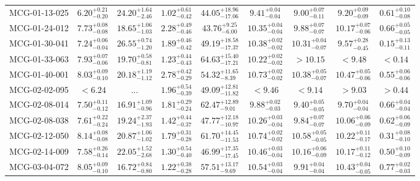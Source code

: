 \documentclass[onecolumn]{mn2e}
\begin{document}
{\begin{center}
\begin{longtable}{lcccccccc}
MCG-01-13-025 & $6.20_{-0.20}^{+0.21}$ & $24.20_{-2.46}^{+1.64}$ & $1.02_{-0.42}^{+0.61}$ &$44.05_{-17.06}^{+18.96}$ & $9.41_{-0.04}^{+0.04}$ & $9.00_{-0.11}^{+0.07}$ & $9.20_{-0.09}^{+0.09}$ & $0.61_{-0.08}^{+0.10}$ \\
MCG-01-24-012 & $7.73_{-0.08}^{+0.08}$ & $18.65_{-1.03}^{+1.06}$ & $2.28_{-0.46}^{+0.49}$ &$43.76_{-6.00}^{+9.25}$ & $10.35_{-0.04}^{+0.04}$ & $9.88_{-0.07}^{+0.07}$ & $10.17_{-0.06}^{+0.07}$ & $0.66_{-0.05}^{+0.05}$ \\
MCG-01-30-041 & $7.24_{-0.04}^{+0.06}$ & $26.55_{-1.20}^{+0.74}$ & $1.89_{-0.42}^{+0.46}$ &$49.19_{-17.37}^{+18.58}$ & $10.38_{-0.02}^{+0.02}$ & $10.31_{-0.07}^{+0.04}$ & $9.57_{-0.45}^{+0.28}$ & $0.15_{-0.11}^{+0.13}$ \\
MCG-01-33-063 & $7.93_{-0.06}^{+0.07}$ & $19.70_{-0.81}^{+0.58}$ & $1.23_{-0.43}^{+0.44}$ &$64.63_{-17.21}^{+15.40}$ & $10.22_{-0.02}^{+0.02}$ & $>10.15$ & $<9.48$ & $<0.14$ \\
MCG-01-40-001 & $8.03_{-0.10}^{+0.09}$ & $20.18_{-1.12}^{+1.19}$ & $2.78_{-0.29}^{+0.42}$ &$54.32_{-8.39}^{+11.65}$ & $10.73_{-0.02}^{+0.02}$ & $10.38_{-0.07}^{+0.05}$ & $10.47_{-0.06}^{+0.05}$ & $0.55_{-0.06}^{+0.06}$ \\
MCG-02-02-095 & $<6.24$ & ... & $1.96_{-0.39}^{+0.54}$ &$49.09_{-11.82}^{+12.81}$ & $<9.46$ & $<9.14$ & $>9.03$ & $>0.44$ \\
MCG-02-08-014 & $7.50_{-0.12}^{+0.11}$ & $16.91_{-0.96}^{+1.09}$ & $1.81_{-0.24}^{+0.29}$ &$62.47_{-9.01}^{+12.89}$ & $9.88_{-0.03}^{+0.02}$ & $9.40_{-0.05}^{+0.05}$ & $9.70_{-0.04}^{+0.04}$ & $0.66_{-0.04}^{+0.04}$ \\
MCG-02-08-038 & $7.61_{-0.24}^{+0.22}$ & $19.24_{-1.93}^{+2.37}$ & $1.42_{-0.37}^{+0.44}$ &$47.77_{-10.97}^{+12.18}$ & $10.26_{-0.04}^{+0.03}$ & $9.84_{-0.07}^{+0.07}$ & $10.06_{-0.09}^{+0.06}$ & $0.62_{-0.09}^{+0.06}$ \\
MCG-02-12-050 & $8.14_{-0.08}^{+0.08}$ & $20.87_{-1.02}^{+1.06}$ & $1.79_{-0.28}^{+0.31}$ &$61.70_{-11.53}^{+14.45}$ & $10.74_{-0.02}^{+0.02}$ & $10.58_{-0.05}^{+0.05}$ & $10.22_{-0.17}^{+0.11}$ & $0.31_{-0.10}^{+0.08}$ \\
MCG-02-14-009 & $7.58_{-0.14}^{+0.26}$ & $22.05_{-2.68}^{+1.52}$ & $1.30_{-0.40}^{+0.54}$ &$46.99_{-17.45}^{+17.35}$ & $10.46_{-0.04}^{+0.03}$ & $10.16_{-0.09}^{+0.06}$ & $10.17_{-0.12}^{+0.11}$ & $0.50_{-0.09}^{+0.10}$ \\
MCG-03-04-072 & $8.05_{-0.10}^{+0.09}$ & $16.72_{-0.80}^{+0.84}$ & $1.22_{-0.28}^{+0.38}$ &$57.51_{-9.69}^{+13.17}$ & $10.54_{-0.04}^{+0.03}$ & $9.91_{-0.04}^{+0.04}$ & $10.43_{-0.05}^{+0.04}$ & $0.77_{-0.03}^{+0.02}$ \\

\end{longtable}
\end{center}}
\end{document}
